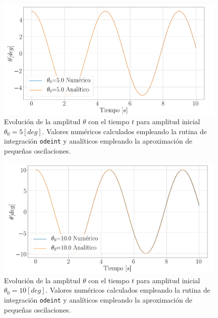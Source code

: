 \documentclass[journal]{IEEEtran}
\begin{document}
\begin{figure}[!htb]
  \centering
  \includegraphics[width=\linewidth]{theta_5_diff}
  \caption{Evolución de la amplitud $\theta$ con el tiempo $t$ para amplitud inicial $\theta_0 = 5 [deg]$. Valores numéricos calculados empleando la rutina de integración \texttt{odeint} y analíticos empleando la aproximación de pequeñas oscilaciones.}
  \label{fig:numanal_5}
\end{figure}
\begin{figure}[!htb]
  \centering
  \includegraphics[width=\linewidth]{theta_10_diff}
  \caption{Evolución de la amplitud $\theta$ con el tiempo $t$ para amplitud inicial $\theta_0 = 10 [deg]$. Valores numéricos calculados empleando la rutina de integración \texttt{odeint} y analíticos empleando la aproximación de pequeñas oscilaciones.}
  \label{fig:numanal_10}
\end{figure}
\end{document}
